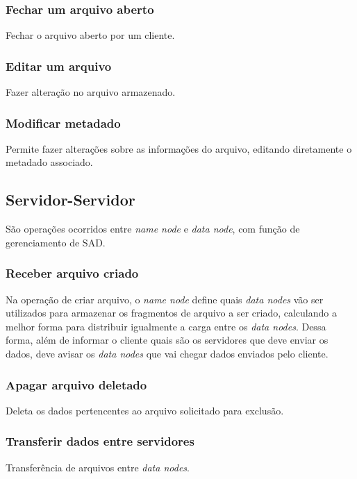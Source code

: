 	\subsubsection{Fechar um arquivo aberto}
	
	Fechar o arquivo aberto por um cliente.
	
	\subsubsection{Editar um arquivo}
	
	Fazer alteração no arquivo armazenado.
	
	\subsubsection{Modificar metadado}
	
	Permite fazer alterações sobre as informações do arquivo, editando diretamente o metadado associado.
	
	
	\subsection{Servidor-Servidor}
	São operações ocorridos entre \textit{name node} e \textit{data node}, com função de gerenciamento de SAD.
	
	\subsubsection{Receber arquivo criado}
	
	Na operação de criar arquivo, o \textit{name node} define quais \textit{data nodes} vão ser utilizados para armazenar os fragmentos de arquivo a ser criado, calculando a melhor forma para distribuir igualmente a carga entre os \textit{data nodes}. Dessa forma, além de informar o cliente quais são os servidores que deve enviar os dados, deve avisar os \textit{data nodes} que vai chegar dados enviados pelo cliente.
	
	\subsubsection{Apagar arquivo deletado}
	
	Deleta os dados pertencentes ao arquivo solicitado para exclusão.
	
	\subsubsection{Transferir dados entre servidores}
	
	Transferência de arquivos entre \textit{data nodes}.
	
	
	
	
